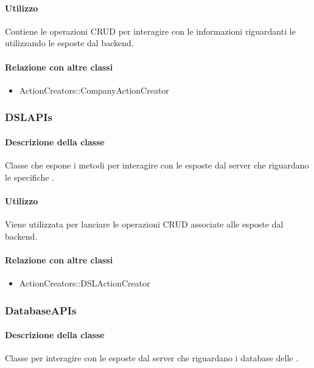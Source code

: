 \paragraph*{Utilizzo}
Contiene le operazioni CRUD per interagire con le informazioni riguardanti le  utilizzando le  esposte dal backend.

\paragraph*{Relazione con altre classi}
\begin{itemize}
\item ActionCreators::CompanyActionCreator
\end{itemize}

\subsubsection{DSLAPIs}
\paragraph*{Descrizione della classe}
Classe che espone i metodi per interagire con le  esposte dal server che riguardano le specifiche .

\paragraph*{Utilizzo}
Viene utilizzata per lanciare le operazioni CRUD associate alle  esposte dal backend.

\paragraph*{Relazione con altre classi}
\begin{itemize}
\item ActionCreators::DSLActionCreator
\end{itemize}

\subsubsection{DatabaseAPIs}
\paragraph*{Descrizione della classe}
Classe per interagire con le  esposte dal server che riguardano i database delle .

